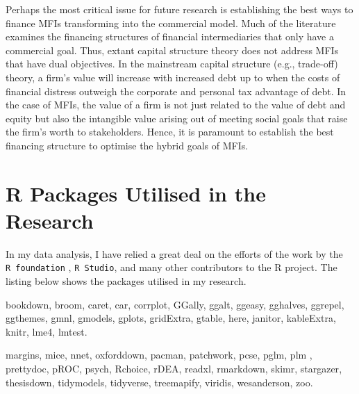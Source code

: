 \documentclass[a4paper, nobind]{templates/ociamthesis}
\begin{document}
Perhaps the most critical issue for future research is establishing the best ways to finance MFIs transforming into the commercial model. Much of the literature examines the financing structures of financial intermediaries that only have a commercial goal. Thus, extant capital structure theory does not address MFIs that have dual objectives. In the mainstream capital structure (e.g., trade-off) theory, a firm's value will increase with increased debt up to when the costs of financial distress outweigh the corporate and personal tax advantage of debt. In the case of MFIs, the value of a firm is not just related to the value of debt and equity but also the intangible value arising out of meeting social goals that raise the firm's worth to stakeholders. Hence, it is paramount to establish the best financing structure to optimise the hybrid goals of MFIs.

\startappendices

\hypertarget{r-packages-utilised-in-the-research}{%
\chapter{R Packages Utilised in the Research}\label{r-packages-utilised-in-the-research}}

In my data analysis, I have relied a great deal on the efforts of the work by the \texttt{R\ foundation} \autocite{R}, \texttt{R\ Studio}, and many other contributors to the R project. The listing below shows the packages utilised in my research.

bookdown\autocite{bookdown},
broom\autocite{broom},
caret\autocite{caret},
car\autocite{car},
corrplot\autocite{corrplot2021},
GGally\autocite{ggally},
ggalt\autocite{ggalt},
ggeasy\autocite{ggeasy},
gghalves\autocite{gghalves},
ggrepel\autocite{ggrepel},
ggthemes\autocite{ggthemes},
gmnl\autocite{gmnl},
gmodels\autocite{gmodels},
gplots\autocite{gplots},
gridExtra\autocite{gridextra},
gtable\autocite{gtable},
here\autocite{here},
janitor\autocite{janitor},
kableExtra\autocite{kableExtra},
knitr\autocite{knitr},
lme4\autocite{lme4},
lmtest\autocite{lmtest}.

margins\autocite{margins},
mice\autocite{mice},
nnet\autocite{nnet},
oxforddown\autocite{lyngsOxforddown2019},
pacman\autocite{pacman},
patchwork\autocite{patchwork},
pcse\autocite{pcse},
pglm\autocite{pglm},
plm \autocite{plm},
prettydoc\autocite{prettydoc},
pROC\autocite{pROC},
psych\autocite{psych},
Rchoice\autocite{rchoice},
rDEA\autocite{rdea},
readxl\autocite{readxl},
rmarkdown\autocite{rmarkdown},
skimr\autocite{skimr},
stargazer\autocite{stargazer},
thesisdown\autocite{thesisdown2021},
tidymodels\autocite{tidymodels},
tidyverse\autocite{tidyverse},
treemapify\autocite{treemap},
viridis\autocite{viridis},
wesanderson\autocite{wesanderson},
zoo\autocite{zoo}.
\end{document}
